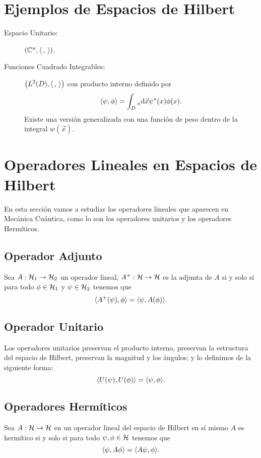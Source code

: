 \section{Ejemplos de Espacios de Hilbert}

\begin{description}
	\item[Espacio Unitario: ] $\qty(\mathbb{C} ^n, \langle \, , \, \rangle)$.
	\item[Funciones Cuadrado Integrables: ] $\qty(L ^2 (D), \langle \, , \, \rangle)$ con producto interno definido por
		$$ \langle \psi , \phi \rangle = \int _D \prescript{}{n}{\text{d}} \vec{x} \psi ^* (x) \phi (x). $$
		Existe una versión generalizada con una función de peso dentro de la integral $w(\vec{x})$.
\end{description}



\section{Operadores Lineales en Espacios de Hilbert}
En esta sección vamos a estudiar los operadores lineales que aparecen en Mecánica Cuántica, como lo son los operadores unitarios y los operadores Hermíticos. 

\subsection{Operador Adjunto}
Sea $A:\mathcal{H} _1 \to \mathcal{H}_2$ un operador lineal, $A^+ :\mathcal{H} \to \mathcal{H}$ es la adjunta de $A$ si y solo si para todo $\phi \in \mathcal{H}_1$ y $\psi \in \mathcal{H} _2$ tenemos que
	$$ \langle A^+ (\psi) , \phi \rangle = \langle \psi , A(\phi) \rangle. $$
	
\subsection{Operador Unitario}
Los operadores unitarios preservan el producto interno, preservan la estructura del espacio de Hilbert, preservan la magnitud y los ángulos; y lo definimos de la siguiente forma:
	$$ \langle U(\psi) , U(\phi) \rangle = \langle \psi , \phi \rangle. $$
	
\subsection{Operadores Hermíticos}
Sea $A:\mathcal{H} \to \mathcal{H}$ en un operador lineal del espacio de Hilbert en sí mismo $A$ es hermítico si y solo si para todo $\psi, \phi \in \mathcal{H}$ tenemos que 
	$$ \langle \psi , A\phi \rangle = \langle A\psi , \phi \rangle. $$
	

